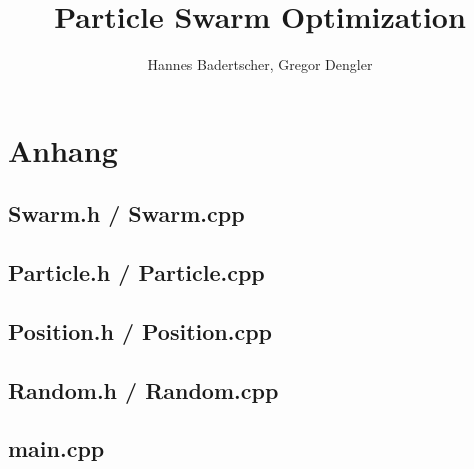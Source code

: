 \documentclass{article}
\title{Particle Swarm Optimization}
\author{Hannes Badertscher, Gregor Dengler}
\numberwithin{equation}{section}
\numberwithin{figure}{section}
\begin{document}
	
	
	
	
	
	
	
	
	
	
	\newpage
	
	
	
	\newpage
	\section{Anhang}
	\subsection{Swarm.h / Swarm.cpp}
	
	
	\subsection{Particle.h / Particle.cpp}
	
	
	\subsection{Position.h / Position.cpp}
	
	
	\subsection{Random.h / Random.cpp}
	
	
	\subsection{main.cpp}
	
	
\end{document}
